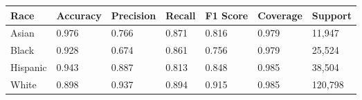 \begin{tabular}{lllllll}
\toprule
Race & Accuracy & Precision & Recall & F1 Score & Coverage & Support \\
\midrule
Asian & 0.976 & 0.766 & 0.871 & 0.816 & 0.979 & 11,947 \\
Black & 0.928 & 0.674 & 0.861 & 0.756 & 0.979 & 25,524 \\
Hispanic & 0.943 & 0.887 & 0.813 & 0.848 & 0.985 & 38,504 \\
White & 0.898 & 0.937 & 0.894 & 0.915 & 0.985 & 120,798 \\
\bottomrule
\end{tabular}
